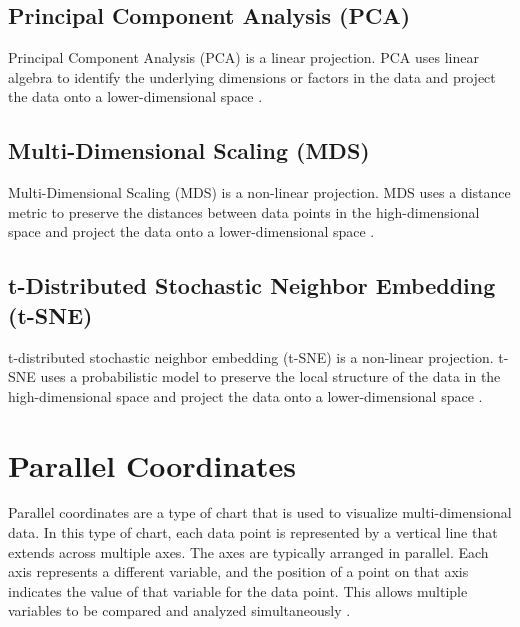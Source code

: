 \subsection{Principal Component Analysis (PCA)}

Principal Component Analysis (PCA) is a linear projection. PCA uses
linear algebra to identify the underlying dimensions or factors in the
data and project the data onto a lower-dimensional space
\parencite{abdi2010principal}.


\subsection{Multi-Dimensional Scaling (MDS)}

Multi-Dimensional Scaling (MDS) is a non-linear projection. MDS uses a
distance metric to preserve the distances between data points in the
high-dimensional space and project the data onto a lower-dimensional
space \parencite{morrison2003fast}.


\subsection{t-Distributed Stochastic Neighbor Embedding (t-SNE)}

t-distributed stochastic neighbor embedding (t-SNE) is a non-linear
projection. t-SNE uses a probabilistic model to preserve the local
structure of the data in the high-dimensional space and project the
data onto a lower-dimensional space \parencite{van2008visualizing}.







\section{Parallel Coordinates}

Parallel coordinates are a type of chart that is used to visualize
multi-dimensional data. In this type of chart, each data point is
represented by a vertical line that extends across multiple axes. The axes
are typically arranged in parallel. Each axis represents a different
variable, and the position of a point on that axis indicates the value of
that variable for the data point. This allows multiple variables to be
compared and analyzed simultaneously \parencite{inselberg1990parallel}.







